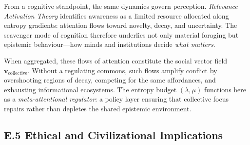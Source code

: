 \documentclass[11pt,a4paper,titlepage]{article}
\theoremstyle{definition}
\begin{document}
From a cognitive standpoint, the same dynamics govern perception.  
\emph{Relevance Activation Theory} identifies awareness as a limited resource
allocated along entropy gradients: attention flows toward novelty, decay, and uncertainty.
The scavenger mode of cognition therefore underlies not only material foraging but 
epistemic behaviour—how minds and institutions decide \emph{what matters}.

When aggregated, these flows of attention constitute the social vector field~$\mathbf{v}_{\text{collective}}$. 
Without a regulating commons, such flows amplify conflict by overshooting regions of decay, 
competing for the same affordances, and exhausting informational ecosystems.
The entropy budget $(\lambda,\mu)$ functions here as a 
\emph{meta-attentional regulator}: a policy layer ensuring that 
collective focus repairs rather than depletes the shared epistemic environment.

\subsection*{E.5 Ethical and Civilizational Implications}
\end{document}
